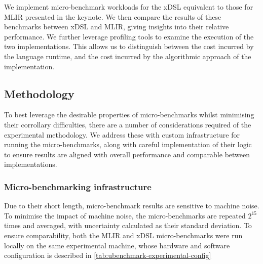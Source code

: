 We implement micro-benchmark workloads for the xDSL equivalent to those for MLIR presented in the keynote. %
We then compare the results of these benchmarks between xDSL and MLIR, giving insights into their relative performance. We further leverage profiling tools to examine the execution of the two implementations. This allows us to distinguish between the cost incurred by the language runtime, and the cost incurred by the algorithmic approach of the implementation.





\subsection{Methodology}
\label{ssec:ubenchmark-methodology}


To best leverage the desirable properties of micro-benchmarks whilst minimising their corrollary difficulties, there are a number of considerations required of the experimental methodology.
We address these with custom infrastructure for running the micro-benchmarks, along with careful implementation of their logic to ensure results are aligned with overall performance and comparable between implementations.

\subsubsection{Micro-benchmarking infrastructure}
\label{sssec:ubenchmark-methodology-infra}

Due to their short length, micro-benchmark results are sensitive to machine noise.
To minimise the impact of machine noise, the micro-benchmarks are repeated $2^{15}$ times and averaged, with uncertainty calculated as their standard deviation. To ensure comparability, both the MLIR and xDSL micro-benchmarks were run locally on the same experimental machine, whose hardware and software configuration is described in \autoref{tab:ubenchmark-experimental-config}

